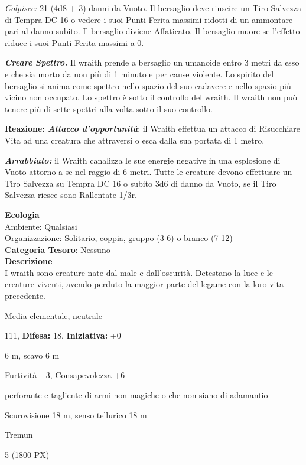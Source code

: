 \begin{multicols}{2}
{\emph{Colpisce:} 21 (4d8 + 3) danni da Vuoto. Il bersaglio deve riuscire un Tiro Salvezza di Tempra DC 16 o vedere i suoi Punti Ferita massimi ridotti di un ammontare pari al danno subito. Il bersaglio diviene Affaticato. Il bersaglio muore se l'effetto riduce i suoi Punti Ferita massimi a 0.

\emph{\textbf{Creare Spettro.}} Il wraith prende a bersaglio un umanoide entro 3 metri da esso e che sia morto da non più di 1 minuto e per cause violente. Lo spirito del bersaglio si anima come spettro nello spazio del suo cadavere e nello spazio più vicino non occupato. Lo spettro è sotto il controllo del wraith. Il wraith non può tenere più di sette spettri alla volta sotto il suo controllo.

\textbf{Reazione: \emph{Attacco d'opportunità}}: il Wraith effettua un attacco di Risucchiare Vita ad una creatura che attraversi o esca dalla sua portata di 1 metro.

\emph{\textbf{Arrabbiato:}} il Wraith canalizza le sue energie negative in una esplosione di Vuoto attorno a se nel raggio di 6 metri. Tutte le creature devono effettuare un Tiro Salvezza su Tempra DC 16 o subito 3d6 di danno da Vuoto, se il Tiro Salvezza riesce sono Rallentate 1/3r.

\textbf{Ecologia}\\
Ambiente: Qualsiasi\\
Organizzazione: Solitario, coppia, gruppo (3-6) o branco (7-12)\\
\textbf{Categoria Tesoro}: Nessuno\\
\textbf{Descrizione}\\
I wraith sono creature nate dal male e dall'oscurità. Detestano la luce e le creature viventi, avendo perduto la maggior parte del legame con la loro vita precedente.


\noindent
\begin{description}[noitemsep, topsep=0pt, parsep=0pt, partopsep=0pt, leftmargin=0cm, labelwidth=2.2cm]
	\item[\textbf{Taglia/Tipo:}] Media elementale, neutrale
	\item[\textbf{Caratt.:}] 
	\item[\textbf{Punti Ferita:}] 111,  \textbf{Difesa:} 18,  \textbf{Iniziativa:} +0
	\item[\textbf{Movimento:}] 6 m, scavo 6 m
	\item[\textbf{Tiri Salvez.:}] 
	\item[\textbf{Comp.:}] Furtività +3, Consapevolezza +6
	\item[\textbf{Res. Danni:}] perforante e tagliente di armi non magiche o che non siano di adamantio
	\item[\textbf{Sensi:}] Scurovisione 18 m, senso tellurico 18 m
	\item[\textbf{Linguaggi:}] Tremun
	\item[\textbf{Sfida:}] 5 (1800 PX)\smallskip
\end{description}

}
\end{multicols}
